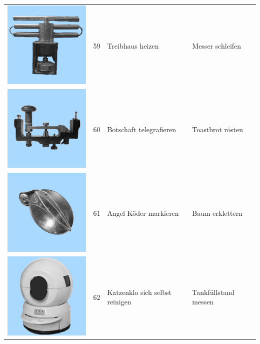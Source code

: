 \documentclass[
  english,
  doc,12pt,twoside,floatsintext]{apa7}
\begin{document}
\begin{center}
\begin{ThreePartTable}
\begin{longtable}{llll}
\includegraphics[valign=c, scale=0.19]{../materials/unfamiliar/59.png} & 59 & Treibhaus heizen & Messer schleifen\\
\includegraphics[valign=c, scale=0.19]{../materials/unfamiliar/60.png} & 60 & Botschaft telegrafieren & Toastbrot rösten\\
\includegraphics[valign=c, scale=0.19]{../materials/unfamiliar/61.png} & 61 & Angel Köder markieren & Baum erklettern\\
\includegraphics[valign=c, scale=0.19]{../materials/unfamiliar/62.png} & 62 & Katzenklo sich selbst reinigen & Tankfüllstand messen\\

\end{longtable}
\end{ThreePartTable}
\end{center}
\end{document}

